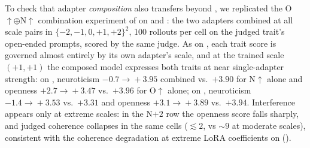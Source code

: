 To check that adapter \emph{composition} also transfers beyond
\LlamaThreePointOneSizeEightBInstruct, we replicated the
O$\uparrow\oplus$N$\uparrow$ combination experiment of
 on \GemmaThreeSizeTwelveBIT and
\GemmaThreeSizeTwentySevenBIT: the two adapters combined at all scale pairs in
$\{-2,-1,0,+1,+2\}^2$, 100 rollouts per cell on the judged trait's open-ended
prompts, scored by the same \QwenThreeSizeTwoThreeFiveB judge. As on
\LlamaThreePointOneSizeEightBInstruct, each trait score is governed almost
entirely by its own adapter's scale, and at the trained scale $(+1,+1)$ the
composed model expresses both traits at near single-adapter strength: on
\GemmaThreeSizeTwelveBIT, neuroticism $-0.7\!\to\!+3.95$ combined vs.\
$+3.90$ for N$\uparrow$ alone and openness $+2.7\!\to\!+3.47$ vs.\ $+3.96$
for O$\uparrow$ alone; on \GemmaThreeSizeTwentySevenBIT, neuroticism
$-1.4\!\to\!+3.53$ vs.\ $+3.31$ and openness $+3.1\!\to\!+3.89$ vs.\ $+3.94$.
Interference appears only at extreme scales: in the N$+2$ row the openness
score falls sharply, and judged coherence collapses in the same cells
(${\lesssim}2$, vs ${\sim}9$ at moderate scales), consistent with the
coherence degradation at extreme LoRA coefficients on
\LlamaThreePointOneSizeEightBInstruct ().

